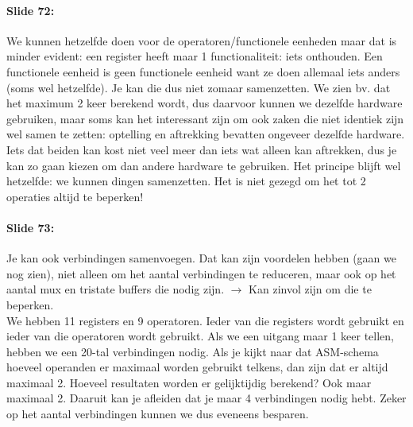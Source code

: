 \documentclass[10pt,a4paper]{book}
\begin{document}
\paragraph{Slide 72:} We kunnen hetzelfde doen voor de operatoren/functionele eenheden maar dat is minder evident: een register heeft maar 1 functionaliteit: iets onthouden. Een functionele eenheid is geen functionele eenheid want ze doen allemaal iets anders (soms wel hetzelfde). Je kan die dus niet zomaar samenzetten. We zien bv. dat het maximum 2 keer berekend wordt, dus daarvoor kunnen we dezelfde hardware gebruiken, maar soms kan het interessant zijn om ook zaken die niet identiek zijn wel samen te zetten: optelling en aftrekking bevatten ongeveer dezelfde hardware. Iets dat beiden kan kost niet veel meer dan iets wat alleen kan aftrekken, dus je kan zo gaan kiezen om dan andere hardware te gebruiken. Het principe blijft wel hetzelfde: we kunnen dingen samenzetten. Het is niet gezegd om het tot 2 operaties altijd te beperken!

\paragraph{Slide 73:} Je kan ook verbindingen samenvoegen. Dat kan zijn voordelen hebben (gaan we nog zien), niet alleen om het aantal verbindingen te reduceren, maar ook op het aantal mux en tristate buffers die nodig zijn. $\rightarrow$ Kan zinvol zijn om die te beperken.\\
We hebben 11 registers en 9 operatoren. Ieder van die registers wordt gebruikt en ieder van die operatoren wordt gebruikt. Als we een uitgang maar 1 keer tellen, hebben we een 20-tal verbindingen nodig. Als je kijkt naar dat ASM-schema hoeveel operanden er maximaal worden gebruikt telkens, dan zijn dat er altijd maximaal 2. Hoeveel resultaten worden er gelijktijdig berekend? Ook maar maximaal 2. Daaruit kan je afleiden dat je maar 4 verbindingen nodig hebt. Zeker op het aantal verbindingen kunnen we dus eveneens besparen.
\end{document}
